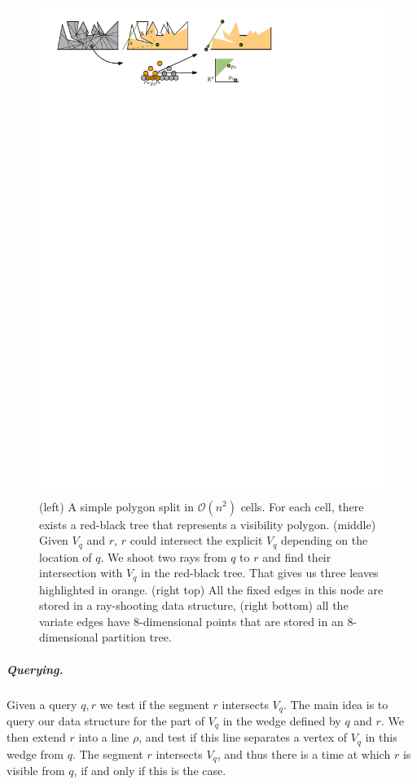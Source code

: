 \documentclass[UKenglish]{lipics-v2019}
\begin{document}
\begin{figure}[t]
    \centering
    \includegraphics[]{../twolevel}
    \caption{ (left) A simple polygon split in $\mathcal{O}(n^2)$
      cells. For each cell, there exists a red-black tree that
      represents a visibility polygon. (middle) Given $V_q$ and $r$,
      $r$ could intersect the explicit $V_q$ depending on the location
      of $q$. We shoot two rays from $q$ to $r$ and find their
      intersection with $V_q$ in the red-black tree. That gives us
      three leaves highlighted in orange. (right top) All the fixed
      edges in this node are stored in a ray-shooting data structure,
      (right bottom) all the variate edges have 8-dimensional points
      that are stored in an $8$-dimensional partition
      tree.}
    \label{fig:twolevel}
\end{figure}

\subparagraph{Querying.} Given a query $q,r$ we test if the segment $r$
intersects $V_q$. The main idea is to query our data structure for the part of
$V_q$ in the wedge defined by $q$ and $r$. We then extend $r$ into a line $\rho$, and
test if this line separates a vertex of $V_q$ in this wedge from $q$. The
segment $r$ intersects $V_q$, and thus there is a time at which $r$ is visible
from $q$, if and only if this is the case.
\end{document}
